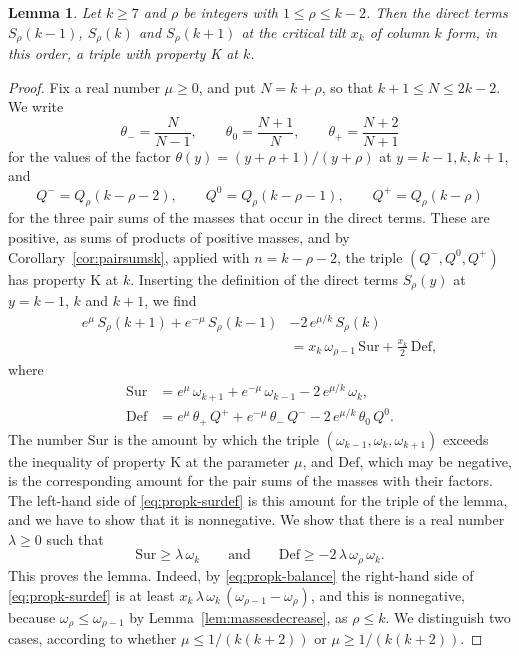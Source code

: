 \documentclass{amsart}
\newtheorem{lemma}[theorem]{Lemma}
\theoremstyle{definition}
\theoremstyle{remark}
\numberwithin{equation}{section}
\begin{document}
\begin{lemma}\label{lem:directk}
Let $k\ge7$ and $\rho$ be integers with $1\le\rho\le k-2$. Then the direct
terms $S_\rho(k-1)$, $S_\rho(k)$ and $S_\rho(k+1)$ at the critical tilt
$x_k$ of column $k$ form, in this order, a triple with property K at $k$.
\end{lemma}

\begin{proof}
Fix a real number $\mu\ge0$, and put $N=k+\rho$, so that
$k+1\le N\le2k-2$. We write
\[
\theta_-=\frac{N}{N-1},\qquad\theta_0=\frac{N+1}{N},\qquad
\theta_+=\frac{N+2}{N+1}
\]
for the values of the factor $\theta(y)=(y+\rho+1)/(y+\rho)$ at
$y=k-1,k,k+1$, and
\[
Q^{-}=Q_\rho(k-\rho-2),\qquad Q^{0}=Q_\rho(k-\rho-1),\qquad
Q^{+}=Q_\rho(k-\rho)
\]
for the three pair sums of the masses that occur in the direct terms. These
are positive, as sums of products of positive masses, and by
Corollary~\ref{cor:pairsumsk}, applied with $n=k-\rho-2$, the triple
$(Q^{-},Q^{0},Q^{+})$ has property K at $k$. Inserting the definition of
the direct terms $S_\rho(y)$ at $y=k-1$, $k$ and $k+1$, we find
\begin{equation}\label{eq:propk-surdef}
\begin{split}
e^{\mu}\,S_\rho(k+1)+e^{-\mu}\,S_\rho(k-1)&-2\,e^{\mu/k}\,S_\rho(k)\\
&=x_k\,\omega_{\rho-1}\,\mathrm{Sur}+\frac{x_k}{2}\,\mathrm{Def},
\end{split}
\end{equation}
where
\begin{align*}
\mathrm{Sur}&=e^{\mu}\,\omega_{k+1}+e^{-\mu}\,\omega_{k-1}
-2\,e^{\mu/k}\,\omega_k,\\
\mathrm{Def}&=e^{\mu}\,\theta_+\,Q^{+}+e^{-\mu}\,\theta_-\,Q^{-}
-2\,e^{\mu/k}\,\theta_0\,Q^{0}.
\end{align*}
The number $\mathrm{Sur}$ is the amount by which the triple
$(\omega_{k-1},\omega_k,\omega_{k+1})$ exceeds the inequality of property K
at the parameter $\mu$, and $\mathrm{Def}$, which may be negative, is the
corresponding amount for the pair sums of the masses with their factors.
The left-hand
side of \eqref{eq:propk-surdef} is this amount for the triple of the lemma,
and we have to show that it is nonnegative. We show that there is a real
number $\lambda\ge0$ such that
\begin{equation}\label{eq:propk-balance}
\mathrm{Sur}\ge\lambda\,\omega_k\qquad\text{and}\qquad
\mathrm{Def}\ge-2\,\lambda\,\omega_\rho\,\omega_k .
\end{equation}
This proves the lemma. Indeed, by \eqref{eq:propk-balance} the right-hand
side of \eqref{eq:propk-surdef} is at least
$x_k\,\lambda\,\omega_k\,(\omega_{\rho-1}-\omega_\rho)$, and this is
nonnegative, because $\omega_\rho\le\omega_{\rho-1}$ by
Lemma~\ref{lem:massesdecrease}, as $\rho\le k$. We distinguish two cases,
according to whether $\mu\le1/(k(k+2))$ or $\mu\ge1/(k(k+2))$.


\end{proof}
\end{document}
